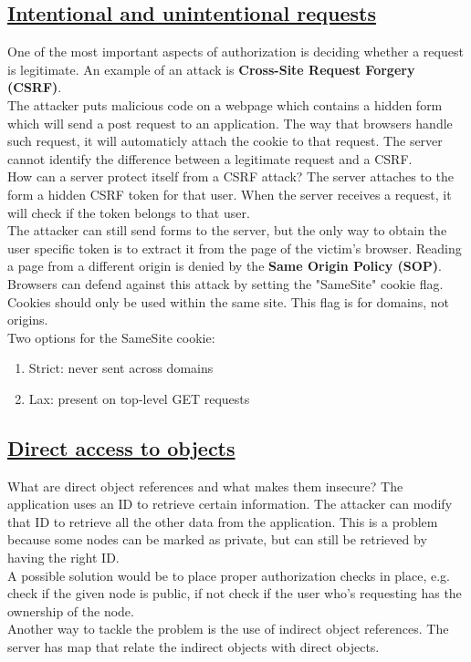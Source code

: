 \documentclass[titlepage]{article}
\begin{document}
    \subsection{\href{https://youtu.be/IMfpqle2mus}{Intentional and unintentional requests}}
    One of the most important aspects of authorization is deciding whether a request is legitimate. An example of an attack is \textbf{Cross-Site Request Forgery (CSRF)}.\\
    The attacker puts malicious code on a webpage which contains a hidden form which will send a post request to an application. The way that browsers handle such request, it will automaticly attach the cookie to that request. The server cannot identify the difference between a legitimate request and a CSRF.\\
    How can a server protect itself from a CSRF attack? The server attaches to the form a hidden CSRF token for that user. When the server receives a request, it will check if the token belongs to that user.\\
    The attacker can still send forms to the server, but the only way to obtain the user specific token is to extract it from the page of the victim's browser. Reading a page from a different origin is denied by the \textbf{Same Origin Policy (SOP)}.\\
    Browsers can defend against this attack by setting the "SameSite" cookie flag. Cookies should only be used within the same site. This flag is for domains, not origins.\\
    Two options for the SameSite cookie:
    \begin{enumerate}
        \item Strict: never sent across domains
        \item Lax: present on top-level GET requests
    \end{enumerate}
    \subsection{\href{https://youtu.be/LEkc8NIFKfo}{Direct access to objects}}
    What are direct object references and what makes them insecure? The application uses an ID to retrieve certain information. The attacker can modify that ID to retrieve all the other data from the application. This is a problem because some nodes can be marked as private, but can still be retrieved by having the right ID.\\
    A possible solution would be to place proper authorization checks in place, e.g. check if the given node is public, if not check if the user who's requesting has the ownership of the node.\\
    Another way to tackle the problem is the use of indirect object references. The server has map that relate the indirect objects with direct objects. 
\end{document}
